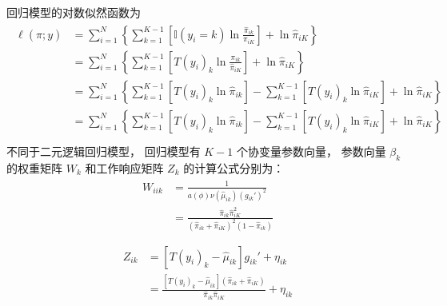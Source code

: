 \documentclass[letterpaper,10pt,english]{sphinxmanual}
\begin{document}
 回归模型的对数似然函数为
\begin{align}\label{equation:无序离散模型/content:无序离散模型/content:19}\!\begin{aligned}
\ell(\hat{\pi};y)
&= \sum_{i=1}^N \left \{ \sum_{k=1}^{K-1} \left [  \mathbb{I}(y_i=k) \ln \frac{ \hat{\pi}_{ik}}{\pi_{iK}} \right ]  + \ln \hat{\pi}_{iK} \right \}\\
&= \sum_{i=1}^N \left \{  \sum_{k=1}^{K-1} \left [ T(y_i)_k \ln \frac{\pi_{ik}}{\hat{\pi}_{iK}}   \right ]  + \ln  \hat{\pi}_{iK} \right   \}\\
&= \sum_{i=1}^N \left \{  \sum_{k=1}^{K-1}  \left [ T(y_i)_k \ln \hat{\pi}_{ik} \right ]
- \sum_{k=1}^{K-1} \left [ T(y_i)_k \ln {\hat{\pi}_{iK}} \right ]   + \ln  \hat{\pi}_{iK} \right \}\\
&= \sum_{i=1}^N \left \{  \sum_{k=1}^{K-1}  \left [ T(y_i)_k \ln \hat{\pi}_{ik} \right ]
- \sum_{k=1}^{K-1} \left [ T(y_i)_k \ln {\hat{\pi}_{iK}} \right ]   + \ln  \hat{\pi}_{iK} \right \}\\
\end{aligned}\end{align}
不同于二元逻辑回归模型， 回归模型有 \(K-1\) 个协变量参数向量，
参数向量 \(\beta_k\) 的权重矩阵 \(W_k\) 和工作响应矩阵 \(Z_k\) 的计算公式分别为：
\begin{align}\label{equation:无序离散模型/content:无序离散模型/content:20}\!\begin{aligned}
W_{iik} &=  \frac{ 1}{ a(\phi) \nu(\hat{\mu}_{ik}) ( g_{ik}' )^2}\\
&= \frac{ \hat{\pi}_{ik} \hat{\pi}_{iK}^2  }{  (\hat{\pi}_{ik} + \hat{\pi}_{iK})^2(1-\hat{\pi}_{ik})   }\\
\end{aligned}\end{align}\begin{align}\label{equation:无序离散模型/content:无序离散模型/content:21}\!\begin{aligned}
Z_{ik} &=  [T(y_i)_{k}- \hat{\mu}_{ik}] g_{ik}' + \eta_{ik}\\
&=  \frac{[T(y_i)_{k}- \hat{\mu}_{ik}](\hat{\pi}_{ik} +\hat{\pi}_{iK})  } {\hat{\pi}_{ik} \hat{\pi}_{iK}}  + \eta_{ik}\\
\end{aligned}\end{align}
\end{document}
